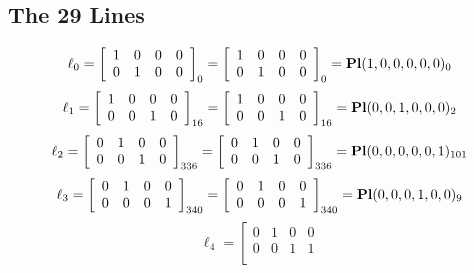 \documentclass{article}
\begin{document}
{\subsection*{The 29 Lines}
$$
\ell_{0} = 
\left[
\begin{array}{*{4}{r}}
1 & 0 & 0 & 0\\
0 & 1 & 0 & 0\\
\end{array}
\right]
_{0}
=
\left[
\begin{array}{*{4}c}
1  & 0  & 0  & 0\\
0  & 1  & 0  & 0\\
\end{array}
\right]_{0}
={\rm\bf Pl}(1,0,0,0,0,0 )_{0}$$
$$
\ell_{1} = 
\left[
\begin{array}{*{4}{r}}
1 & 0 & 0 & 0\\
0 & 0 & 1 & 0\\
\end{array}
\right]
_{16}
=
\left[
\begin{array}{*{4}c}
1  & 0  & 0  & 0\\
0  & 0  & 1  & 0\\
\end{array}
\right]_{16}
={\rm\bf Pl}(0,0,1,0,0,0 )_{2}$$
$$
\ell_{2} = 
\left[
\begin{array}{*{4}{r}}
0 & 1 & 0 & 0\\
0 & 0 & 1 & 0\\
\end{array}
\right]
_{336}
=
\left[
\begin{array}{*{4}c}
0  & 1  & 0  & 0\\
0  & 0  & 1  & 0\\
\end{array}
\right]_{336}
={\rm\bf Pl}(0,0,0,0,0,1 )_{101}$$
$$
\ell_{3} = 
\left[
\begin{array}{*{4}{r}}
0 & 1 & 0 & 0\\
0 & 0 & 0 & 1\\
\end{array}
\right]
_{340}
=
\left[
\begin{array}{*{4}c}
0  & 1  & 0  & 0\\
0  & 0  & 0  & 1\\
\end{array}
\right]_{340}
={\rm\bf Pl}(0,0,0,1,0,0 )_{9}$$
$$
\ell_{4} = 
\left[
\begin{array}{*{4}{r}}
0 & 1 & 0 & 0\\
0 & 0 & 1 & 1\\
\end{array}
$$}
\end{document}
